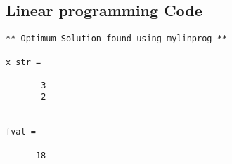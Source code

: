 \documentclass[11pt]{article}
\begin{document}
\subsection*{Linear programming Code}



\begin{lstlisting}[caption={LP output}, label={lst:lp_op}]
 ** Optimum Solution found using mylinprog **

x_str =

       3       
       2       


fval =

      18    
\end{lstlisting}
% 
\end{document}

